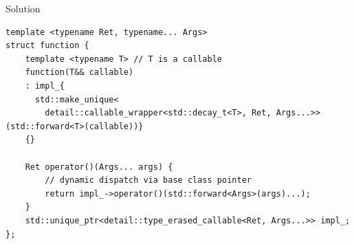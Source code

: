 \begin{frame}[fragile]{Solution}
  \begin{verbatim}
template <typename Ret, typename... Args>
struct function {
    template <typename T> // T is a callable
    function(T&& callable) 
    : impl_{
      std::make_unique<
        detail::callable_wrapper<std::decay_t<T>, Ret, Args...>>(std::forward<T>(callable))} 
    {}

    Ret operator()(Args... args) {
        // dynamic dispatch via base class pointer
        return impl_->operator()(std::forward<Args>(args)...);
    }
    std::unique_ptr<detail::type_erased_callable<Ret, Args...>> impl_;
};
  \end{verbatim}
\end{frame}